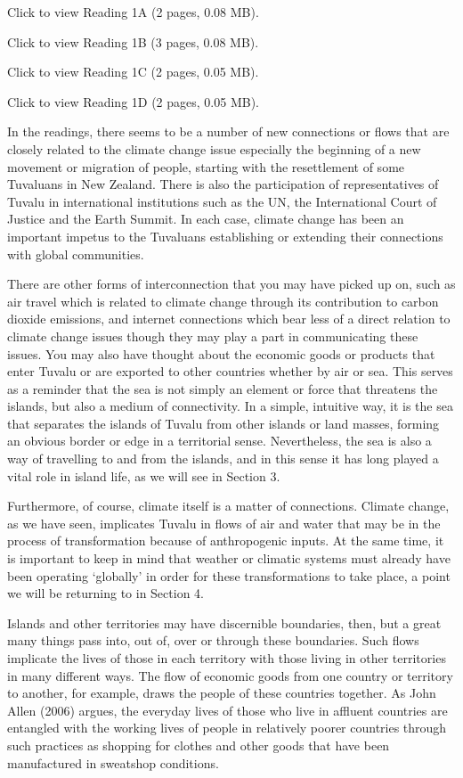 \documentclass[letterpaper,10pt,english]{sphinxmanual}
\begin{document}
Click to view Reading 1A (2 pages, 0.08 MB).

Click to view Reading 1B (3 pages, 0.08 MB).

Click to view Reading 1C (2 pages, 0.05 MB).

Click to view Reading 1D (2 pages, 0.05 MB).

In the readings, there seems to be a number of new connections or flows that are closely related to the climate change issue \textendash{} especially the beginning of a new movement or migration of people, starting with the resettlement of some Tuvaluans in New Zealand. There is also the participation of representatives of Tuvalu in international institutions such as the UN, the International Court of Justice and the Earth Summit. In each case, climate change has been an important impetus to the Tuvaluans
establishing or extending their connections with global communities.

There are other forms of interconnection that you may have picked up on, such as air travel which is related to climate change through its contribution to carbon dioxide emissions, and internet connections which bear less of a direct relation to climate change issues though they may play a part in communicating these issues. You may also have thought about the economic goods or products that enter Tuvalu or are exported to other countries \textendash{} whether by air or sea. This serves as a reminder that
the sea is not simply an element or force that threatens the islands, but also a medium of connectivity. In a simple, intuitive way, it is the sea that separates the islands of Tuvalu from other islands or land masses, forming an obvious border or edge in a territorial sense. Nevertheless, the sea is also a way of travelling to and from the islands, and in this sense it has long played a vital role in island life, as we will see in Section 3.

Furthermore, of course, climate itself is a matter of connections. Climate change, as we have seen, implicates Tuvalu in flows of air and water that may be in the process of transformation because of anthropogenic inputs. At the same time, it is important to keep in mind that weather or climatic systems must already have been operating ‘globally’ in order for these transformations to take place, a point we will be returning to in Section 4.

Islands and other territories may have discernible boundaries, then, but a great many things pass into, out of, over or through these boundaries. Such flows implicate the lives of those in each territory with those living in other territories in many different ways. The flow of economic goods from one country or territory to another, for example, draws the people of these countries together. As John Allen (2006) argues, the everyday lives of those who live in affluent countries are entangled
with the working lives of people in relatively poorer countries through such practices as shopping for clothes and other goods that have been manufactured in sweatshop conditions.
\end{document}
